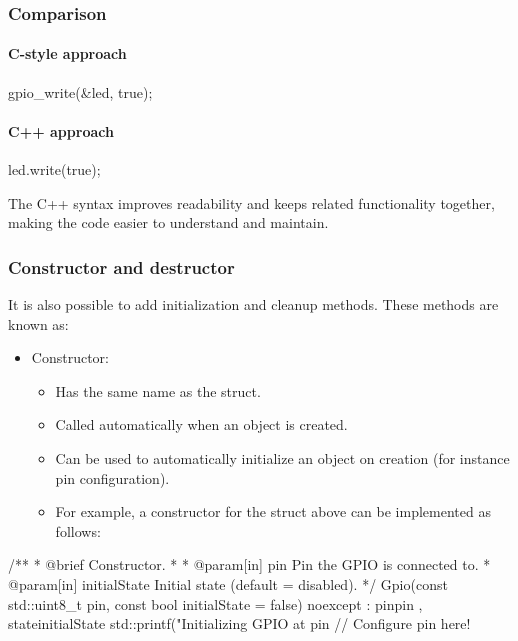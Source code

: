\subsubsection{Comparison}
\paragraph{C-style approach}

\begin{ccode}
gpio_write(&led, true);
\end{ccode}

\paragraph{C++ approach}

\begin{cppcode}
led.write(true);
\end{cppcode}

\noindent The C++ syntax improves readability and keeps related functionality together, making the
code easier to understand and maintain.

\subsubsection{Constructor and destructor}
It is also possible to add initialization and cleanup methods. These methods are known as:
\begin{itemize}
  \item Constructor:
  \begin{itemize}
    \item Has the same name as the struct.
    \item Called automatically when an object is created.
    \item Can be used to automatically initialize an object on creation (for instance pin
      configuration).
    \item For example, a constructor for the  struct above can be implemented
      as follows:
  \end{itemize}
\end{itemize}

\begin{cppcode}
/**
 * @brief Constructor.
 *
 * @param[in] pin Pin the GPIO is connected to.
 * @param[in] initialState Initial state (default = disabled).
 */
Gpio(const std::uint8_t pin, const bool initialState = false) noexcept
    : pin{pin}
    , state{initialState}
{
    std::printf("Initializing GPIO at pin %
    // Configure pin here!
}
\end{cppcode}

